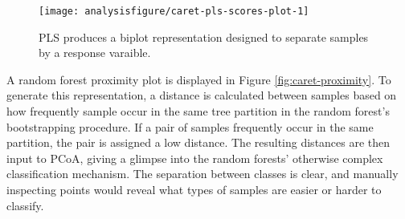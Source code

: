 \begin{knitrout}
\color{fgcolor}\begin{kframe}
\begin{alltt}
\hlstd{()} \hlopt{+}
  \hlstd{(} \hlopt{$}
             \hlstd{(}     \hlstd{=} \hlstd{)} \hlopt{+}
  \hlstd{(} \hlopt{$}
             \hlstd{(} \hlstd{=}  \hlopt{*}   \hlstd{=}  \hlopt{*}   
              \hlstd{=} \hlstd{,}  \hlstd{=} \hlstd{)} \hlopt{+}
  \hlstd{(} \hlstd{=} \hlstd{)} \hlopt{+}
  \hlstd{(} \hlstd{=} \hlstd{,}  \hlstd{=} \hlstd{,}  \hlstd{=} \hlstd{)} \hlopt{+}
  \hlstd{(} \hlstd{=} \hlstd{(} \hlstd{=} \hlstd{(} \hlstd{=} \hlstd{)))} \hlopt{+}
  \hlstd{(} \hlopt{~}  \hlopt{+}
  \hlstd{(} \hlstd{=} \hlstd{(} \hlstd{=} \hlstd{,}  \hlstd{=} \hlstd{(}\hlstd{,} \hlstd{)))}
\end{alltt}
\end{kframe}
\end{knitrout}
\begin{figure}[H]
\texttt{[image: analysisfigure/caret-pls-scores-plot-1]}
\caption{PLS produces a biplot representation designed to separate
  samples by a response varaible.}
\label{fig:caret-pls-scores-plot}
\end{figure}

A random forest proximity plot is displayed in Figure
\ref{fig:caret-proximity}. To generate this representation, a distance
is calculated between samples based on how frequently sample occur in
the same tree partition in the random forest's bootstrapping
procedure. If a pair of samples frequently occur in the same
partition, the pair is assigned a low distance. The resulting
distances are then input to PCoA, giving a glimpse into the random
forests' otherwise complex classification mechanism. The separation
between classes is clear, and manually inspecting points would reveal
what types of samples are easier or harder to classify.

